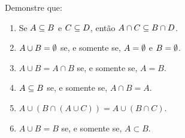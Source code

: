\documentclass[12pt]{exam}
\begin{document}
    \questao{} Demonstre que:
    \begin{enumerate}[label={\alph*})]
        \item Se $A \subseteq B$ e $C \subseteq D$, ent\~ao $A \cap C \subseteq B \cap D$.

        \item $A \cup B = \emptyset$ se, e somente se, $A = \emptyset$ e $B = \emptyset$.

        \item $A \cup B = A \cap B$ se, e somente se,  $A = B$.

        \item $A \subseteq B$ se, e somente se,  $A \cap B = A$.

        \item $A \cup (B \cap (A \cup C)) = A \cup (B \cap C)$.

        \item $A \cup B = B$ se, e somente se, $A \subset B$.
    \end{enumerate}
\end{document}
